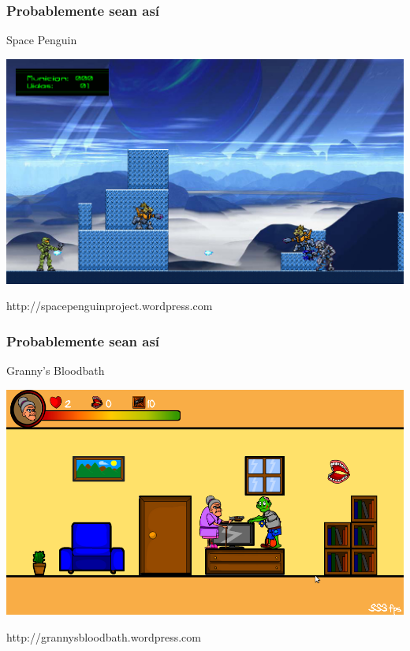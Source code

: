 \begin{frame}
	\frametitle{Probablemente sean así}

	\begin{center}
	Space Penguin
	
	    \includegraphics[scale=0.26]{img/spacepenguin.png}
	    
	http://spacepenguinproject.wordpress.com
	\end{center}
\end{frame}

\begin{frame}
	\frametitle{Probablemente sean así}

	\begin{center}
	Granny's Bloodbath
	
	    \includegraphics[scale=0.26]{img/grannysbloodbath.png}
	    
	http://grannysbloodbath.wordpress.com
	\end{center}
\end{frame}

